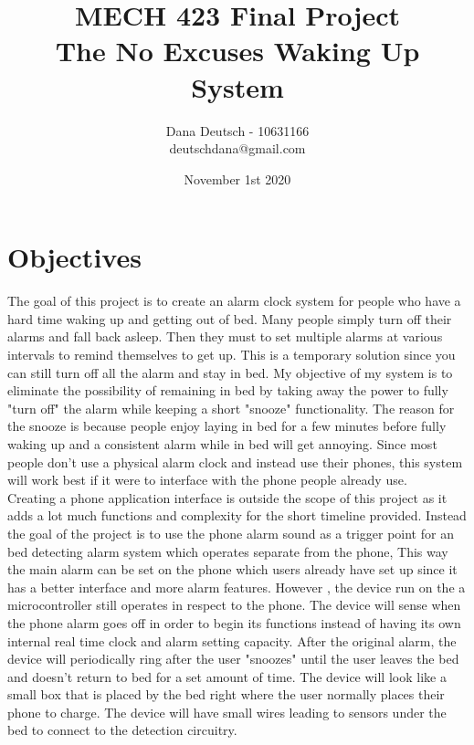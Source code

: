 \documentclass[11pt]{article}
\title{MECH 423 Final Project \\
		The No Excuses Waking Up System}
\author{Dana Deutsch - 10631166\\
		deutschdana@gmail.com}
\date{November 1st 2020}
\begin{document}
\maketitle
\newpage
\tableofcontents
\newpage

\section{Objectives}
The goal of this project is to create an alarm clock system for people who have a hard time waking up and getting out of bed.
Many people simply turn off their alarms and fall back asleep.
Then they must to set multiple alarms at various intervals to remind themselves to get up.
This is a temporary solution since you can still turn off all the alarm and stay in bed.
My objective of my system is to eliminate the possibility of remaining in bed by taking away the power to fully "turn off" the alarm while keeping a short "snooze" functionality. 
The reason for the snooze is because people enjoy laying in bed for a few minutes before fully waking up and a consistent alarm while in bed will get annoying. 
Since most people don't use a physical alarm clock and instead use their phones, this system will work best if it were to interface with the phone people already use.\\

Creating a phone application interface is outside the scope of this project as it adds a lot much functions and complexity for the short timeline provided. 
Instead the goal of the project is to use the phone alarm sound as a trigger point for an bed detecting alarm system which operates separate from the phone,
This way the main alarm can be set on the phone which users already have set up since it has a better interface and more alarm features.
However , the device run on the a microcontroller still operates in respect to the phone. 
The device will sense when the phone alarm goes off in order to begin its functions instead of having its own internal real time clock and alarm setting capacity.  
After the original alarm, the device will periodically ring after the user "snoozes" until the user leaves the bed and doesn't return to bed for a set amount of time. 
The device will look like a small box that is placed by the bed right where the user normally places their phone to charge.
The device will have small wires leading to sensors under the bed to connect to the detection circuitry.
\end{document}

